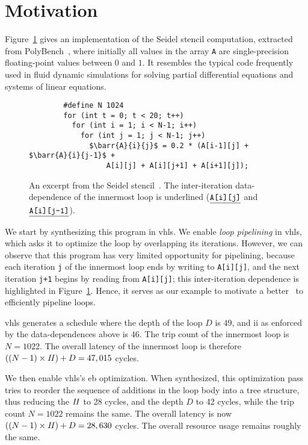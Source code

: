 \section{Motivation}
\label{lo:sec:motivation}

\newcommand\barr[3]{\texttt{\underline{#1[#2][#3]}}}

Figure~\ref{lo:fig:seidel_prog} gives an implementation of the Seidel stencil
computation, extracted from PolyBench~\cite{polybench}, where initially all
values in the array \verb|A| are single-precision floating-point values between
$0$ and $1$.  It resembles the typical code frequently used in fluid dynamic
simulations for solving partial differential equations and systems of linear
equations.

\begin{figure}[ht]
    \begin{lstlisting}
        #define N 1024
        for (int t = 0; t < 20; t++)
          for (int i = 1; i < N-1; i++)
            for (int j = 1; j < N-1; j++)
              $\barr{A}{i}{j}$ = 0.2 * (A[i-1][j] + $\barr{A}{i}{j-1}$ +
                  A[i][j] + A[i][j+1] + A[i+1][j]);
    \end{lstlisting}
    \caption{%
        An excerpt from the Seidel stencil~\cite{polybench}.  The
        inter-iteration data-dependence of the innermost loop is underlined
        ($\barr{A}{i}{j}$ and $\barr{A}{i}{j-1}$).
    }\label{lo:fig:seidel_prog}
\end{figure}

We start by synthesizing this program in \gls{vhls}\@.  We enable \emph{loop
pipelining} in \gls{vhls}, which asks it to optimize the loop by overlapping
its iterations.  However, we can observe that this program has very limited
opportunity for pipelining, because each iteration \verb|j| of the innermost
loop ends by writing to \verb|A[i][j]|, and the next iteration \verb|j+1|
begins by reading from \verb|A[i][j]|; this inter-iteration dependence is
highlighted in Figure~\ref{lo:fig:seidel_prog}.  Hence, it serves as our
example to motivate a better \soap~to efficiently pipeline loops.

\Gls{vhls} generates a schedule where the depth of the loop $D$ is $49$, and
\gls{ii} as enforced by the data-dependences above is $46$.  The trip count of
the innermost loop is $N = 1022$.  The overall latency of the innermost loop is
therefore $((N-1) \times \mathit{II}) + D = 47,015$ cycles.

We then enable \gls{vhls}'s \gls{eb} optimization.  When synthesized, this
optimization pass tries to reorder the sequence of additions in the loop body
into a tree structure, thus reducing the $\mathit{II}$ to 28 cycles, and the depth $D$
to 42 cycles, while the trip count $N = 1022$ remains the same.  The overall
latency is now $((N-1) \times \mathit{II}) + D = 28,630$ cycles.  The overall resource
usage remains roughly the same.

